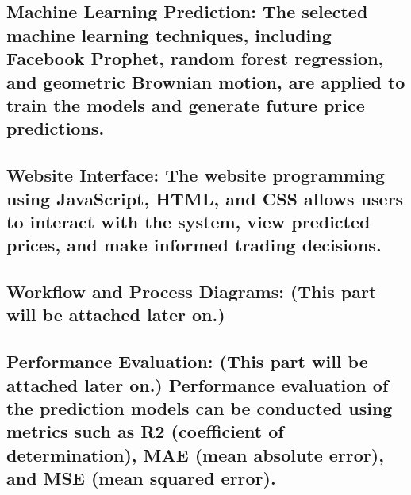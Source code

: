 \subsection{Machine Learning Prediction: The selected machine learning techniques, including Facebook Prophet, random forest regression, and geometric Brownian motion, are applied to train the models and generate future price predictions.}
\subsection{Website Interface: The website programming using JavaScript, HTML, and CSS allows users to interact with the system, view predicted prices, and make informed trading decisions.}
\subsection{Workflow and Process Diagrams: (This part will be attached later on.)}
\subsection{Performance Evaluation: (This part will be attached later on.)
	Performance evaluation of the prediction models can be conducted using metrics such as R2 (coefficient of determination), MAE (mean absolute error), and MSE (mean squared error).}